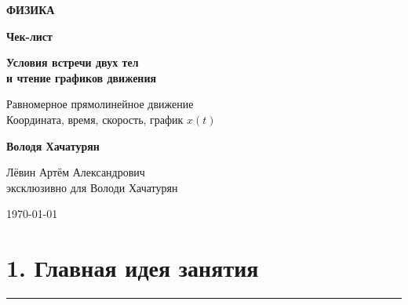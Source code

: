 \documentclass[a4paper,12pt]{article}
\newcommand{\sectionline}{%
    \vspace{-0.4em}
    {\color{accent}\rule{\linewidth}{0.7pt}}
    \vspace{0.4em}
}
\begin{document}

\begin{titlepage}
\thispagestyle{empty}

\begin{center}

\vspace*{23mm}

{\Large\color{darkaccent}\textbf{ФИЗИКА}}

\vspace{10mm}

{\Huge\bfseries Чек-лист}

\vspace{5mm}

{\LARGE\bfseries
Условия встречи двух тел\\[2mm]
и чтение графиков движения}

\vspace{14mm}

{\large
Равномерное прямолинейное движение\\
Координата, время, скорость, график \(x(t)\)
}

\vfill

{\large
\textbf{Володя Хачатурян}
}

\vspace{8mm}

{\large
Лёвин Артём Александрович\\
эксклюзивно для Володи Хачатурян
}

\vspace{8mm}

{\large \today}

\vfill


\end{center}

\end{titlepage}


\section*{\color{darkaccent}1. Главная идея занятия}
\sectionline
\end{document}
